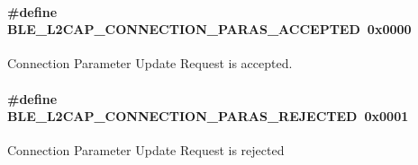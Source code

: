 \paragraph[{\texorpdfstring{B\+L\+E\+\_\+\+L2\+C\+A\+P\+\_\+\+C\+O\+N\+N\+E\+C\+T\+I\+O\+N\+\_\+\+P\+A\+R\+A\+S\+\_\+\+A\+C\+C\+E\+P\+T\+ED}{BLE_L2CAP_CONNECTION_PARAS_ACCEPTED}}]{\setlength{\rightskip}{0pt plus 5cm}\#define B\+L\+E\+\_\+\+L2\+C\+A\+P\+\_\+\+C\+O\+N\+N\+E\+C\+T\+I\+O\+N\+\_\+\+P\+A\+R\+A\+S\+\_\+\+A\+C\+C\+E\+P\+T\+ED~0x0000}\hypertarget{group___b_l_e___l2_c_a_p___c_p_u___r_e_s_u_l_t_ga9c686c73847ab0c074bd749a1e9ed74c}{}\label{group___b_l_e___l2_c_a_p___c_p_u___r_e_s_u_l_t_ga9c686c73847ab0c074bd749a1e9ed74c}
Connection Parameter Update Request is accepted. 
\paragraph[{\texorpdfstring{B\+L\+E\+\_\+\+L2\+C\+A\+P\+\_\+\+C\+O\+N\+N\+E\+C\+T\+I\+O\+N\+\_\+\+P\+A\+R\+A\+S\+\_\+\+R\+E\+J\+E\+C\+T\+ED}{BLE_L2CAP_CONNECTION_PARAS_REJECTED}}]{\setlength{\rightskip}{0pt plus 5cm}\#define B\+L\+E\+\_\+\+L2\+C\+A\+P\+\_\+\+C\+O\+N\+N\+E\+C\+T\+I\+O\+N\+\_\+\+P\+A\+R\+A\+S\+\_\+\+R\+E\+J\+E\+C\+T\+ED~0x0001}\hypertarget{group___b_l_e___l2_c_a_p___c_p_u___r_e_s_u_l_t_gae10edfaceb1a20d8497ab0b2400388e9}{}\label{group___b_l_e___l2_c_a_p___c_p_u___r_e_s_u_l_t_gae10edfaceb1a20d8497ab0b2400388e9}
Connection Parameter Update Request is rejected 